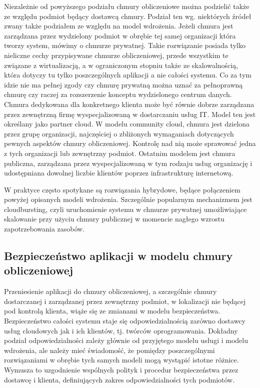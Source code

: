 	Niezależnie od powyższego podziału chmury obliczeniowe można podzielić także ze względu podmiot będący dostawcą chmury. Podział ten wg. niektórych źródeł zwany także podziałem ze względu na model wdrożenia. Jeżeli chmura jest zarządzana przez wydzielony podmiot w obrębie tej samej organizacji która tworzy system, mówimy o chmurze prywatnej. Takie rozwiązanie posiada tylko nieliczne cechy przypisywane chmurze obliczeniowej, przede wszystkim te związane z wirtualizacją, a w ograniczonym stopniu także ze skalowalnością, która dotyczy tu tylko poszczególnych aplikacji a nie całości systemu. Co za tym idzie nie ma pełnej zgody czy chmurę prywatną można  uznać za pełnoprawną chmurę czy raczej za rozszerzenie konceptu wydzielonego centrum danych.  Chmura dedykowana dla konkretnego klienta może być równie dobrze zarządzana przez zewnętrzną firmę wyspecjalizowaną w dostarczaniu usług IT. Model ten jest określany jako partner cloud. W modelu community cloud, chmura jest dzielona przez grupę organizacji, najczęściej o zbliżonych wymaganiach dotyczących pewnych aspektów chmury obliczeniowej. Kontrolę nad nią może sprawować jedna z tych organizacji lub zewnętrzny podmiot. Ostatnim modelem jest chmura publiczna, zarządzana przez wyspecjalizowaną w tym rodzaju usług organizację i udostępniana dowolnej liczbie klientów poprzez infrastrukturę internetową. 

	W praktyce często spotykane są rozwiązania hybrydowe, będące połączeniem powyżej opisanych modeli wdrożenia. Szczególnie popularnym mechanizmem jest cloudbursting, czyli uruchomienie systemu w chmurze prywatnej umożliwiające skalowanie przy użyciu chmury publicznej w momencie nagłego wzrostu zapotrzebowania zasobów.

		
	\subsection{Bezpieczeństwo aplikacji w modelu chmury obliczeniowej}
	
	Przeniesienie aplikacji do chmury obliczeniowej, a szczególnie chmury dostarczanej i zarządzanej przez zewnętrzny podmiot, w lokalizacji nie będącej pod kontrolą klienta, wiąże się ze zmianami w modelu bezpieczeństwa.  Bezpieczeństwo całości systemu staje się odpowiedzialnością zarówno dostawcy usług cloudowych jak i ich klientów, tj. twórców oprogramowania. Dokładny podział odpowiedzialności zależy głównie od przyjętego modelu usługi i modelu wdrożenia, ale należy mieć świadomość, że pomiędzy poszczególnymi rozwiązaniami w obrębie tych samych modeli mogą wystąpić istotne różnice. Wymusza to uzgodnienie wspólnych polityk i procedur bezpieczeństwa przez dostawcę i klienta, definiujących zakres odpowiedzialności tych podmiotów. 

